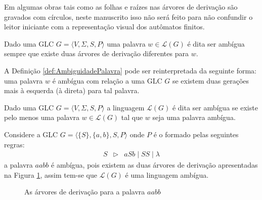 \begin{note}
	Em algumas obras tais como \cite{benjaLivro2010} as folhas e raízes nas árvores de derivação são gravados com círculos, neste manuscrito isso não será feito para não confundir o leitor iniciante com a representação visual dos autômatos finitos.
\end{note}

\begin{definition}[Ambiguidade]\label{def:AmbiguidadePalavra}
	Dado uma GLC $G = \langle V, \Sigma, S, P\rangle$ uma palavra $w \in \mathcal{L}(G)$ é dita ser ambígua sempre que existe duas árvores de derivação diferentes para $w$.
\end{definition}

A Definição \ref{def:AmbiguidadePalavra} pode ser reinterpretada da seguinte forma: uma palavra $w$ é ambígua com relação a uma GLC $G$ se existem duas gerações mais à esquerda (à direta) para tal palavra.

\begin{definition}\label{def:LinguagemAmbiguidade}
	Dado uma GLC $G = \langle V, \Sigma, S, P\rangle$ a linguagem $\mathcal{L}(G)$ é dita ser ambígua se existe pelo menos uma palavra $w \in \mathcal{L}(G)$ tal que $w$ seja uma palavra ambígua.
\end{definition}

\begin{example}
	Considere a GLC $G = \langle \{S\}, \{a, b\}, S, P \rangle$ onde $P$ é o formado pelas seguintes regras:
	\begin{eqnarray*}
		S & \rhd & aSb \mid SS \mid \lambda
	\end{eqnarray*}
	a palavra $aabb$ é ambígua, pois existem as duas árvores de derivação apresentadas na Figura \ref{fig:ArvoresAmbuigas}, assim tem-se que $\mathcal{L}(G)$ é uma linguagem ambígua.
	
	\begin{figure}[h]
		\centering
		\hfill
		\caption{As árvores de derivação para a palavra $aabb$}
		\label{fig:ArvoresAmbuigas}
	\end{figure}
\end{example}

